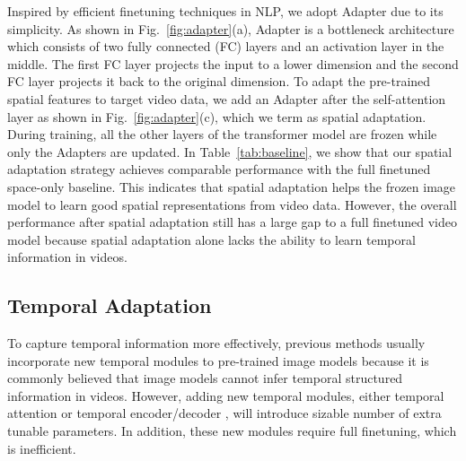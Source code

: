 \documentclass{article} \usepackage{iclr2023_conference,times}
\begin{document}
	Inspired by efficient finetuning techniques \citep{adapter, prompttuning, li-liang-2021-prefix, ben-zaken-etal-2022-bitfit} in NLP, we adopt Adapter \citep{adapter} due to its simplicity. 
	As shown in Fig.\ \ref{fig:adapter}(a), Adapter is a bottleneck architecture which consists of two fully connected (FC) layers and an activation layer in the middle.
	The first FC layer projects the input to a lower dimension and the second FC layer projects it back to the original dimension.
	To adapt the pre-trained spatial features to target video data, we add an Adapter after the self-attention layer as shown in Fig.\ \ref{fig:adapter}(c), which we term as spatial adaptation.
	During training, all the other layers of the transformer model are frozen while only the Adapters are updated. 
	In Table~\ref{tab:baseline}, we show that our spatial adaptation strategy achieves comparable performance with the full finetuned space-only baseline.
	This indicates that spatial adaptation helps the frozen image model to learn good spatial representations from video data. 
	However, the overall performance after spatial adaptation still has a large gap to a full finetuned video model because spatial adaptation alone lacks the ability to learn temporal information in videos.
	
	
	\subsection{Temporal Adaptation}
	\label{subsec:temporal module}
	
	To capture temporal information more effectively, previous methods usually incorporate new temporal modules to pre-trained image models because it is commonly believed that image models cannot infer temporal structured information in videos. 
However, adding new temporal modules, either temporal attention \citep{timesformer,zhang2021vidtr} or temporal encoder/decoder \citep{arnab2021vivit,frozenclip}, will introduce sizable number of extra tunable parameters.
	In addition, these new modules require full finetuning, which is inefficient. 
	
\end{document}
